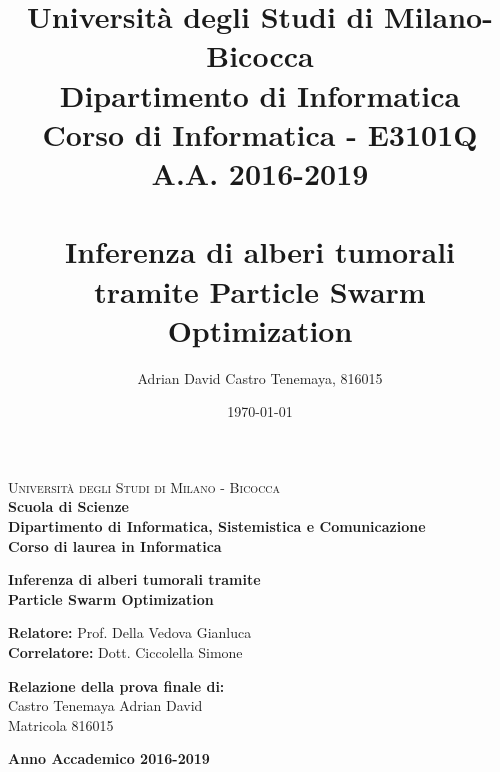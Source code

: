 \documentclass[a4paper,12pt]{book}
\author{Adrian David Castro Tenemaya, 816015}
\title{Università degli Studi di Milano-Bicocca \\{\small Dipartimento di Informatica \\ Corso di Informatica - E3101Q\\A.A. 2016-2019\\\vspace*{0.55in} \ }\\ Inferenza di alberi tumorali tramite Particle Swarm Optimization \vspace*{1.25in}}
\date{\today}
\begin{document}

\begin{titlepage}
    \noindent
    \begin{minipage}[t]{0.19\textwidth}
    \end{minipage}
    \begin{minipage}[t]{0.81\textwidth}
        \textsc{Università degli Studi di Milano - Bicocca} \\
        \textbf{Scuola di Scienze} \\
        \textbf{Dipartimento di Informatica, Sistemistica e Comunicazione} \\
        \textbf{Corso di laurea in Informatica} \\
        \par
    \end{minipage}
    \vspace{40mm}
    \begin{center}
        \large {}
        \textbf{Inferenza di alberi tumorali tramite \\ Particle Swarm Optimization}
        \par
    \end{center}
    \vspace{50mm}
    \noindent
    {\large \textbf{Relatore:} Prof. Della Vedova Gianluca } \\
    \noindent
    {\large \textbf{Correlatore:} Dott. Ciccolella Simone}
    \vspace{15mm}
    \begin{flushright}
        {\large \textbf{Relazione della prova finale di:}} \\
        \large{Castro Tenemaya Adrian David} \\
        \large{Matricola 816015}
    \end{flushright}
    \vspace{40mm}
    \begin{center}
        {\large{\bf Anno Accademico 2016-2019}}
    \end{center}
    \restoregeometry
\end{titlepage}
\end{document}
